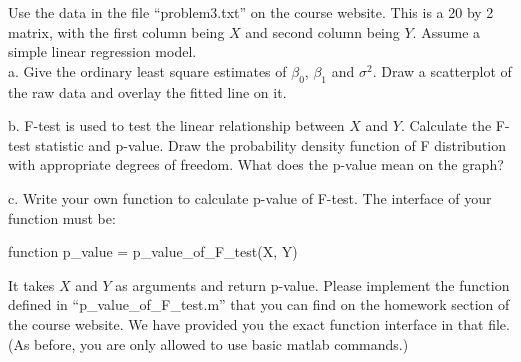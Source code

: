 \documentclass[12pt]{article}
\begin{document}
 {
  Use the data in the file ``problem3.txt'' on the course website. This is a 20 by 2 matrix, with the first column being $X$ and second column being $Y$. Assume a simple linear regression model.\\
 a. Give the ordinary least square estimates of $\beta_0$, $\beta_1$ and $\sigma^2$. Draw a scatterplot of the raw data and overlay the fitted line on it.

 b. F-test is used to test the linear relationship between $X$ and $Y$. Calculate the F-test statistic and p-value. Draw the probability density function of F distribution with appropriate degrees of freedom. What does the p-value mean on the graph?

 c. Write your own function to calculate p-value of F-test. The interface of your function must be:

\begin{center}
function p\_value = p\_value\_of\_F\_test(X, Y)
\end{center}

It takes $X$ and $Y$ as arguments and return p-value. Please implement the function defined in ``p\_value\_of\_F\_test.m'' that you can find on the homework section of the course website. We have provided you the exact function interface in that file. (As before, you are only allowed to use basic matlab commands.)
}
 { \vfill
  \answer
} {}




\problemsdone
\end{document}
